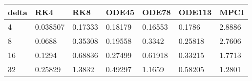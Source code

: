 \begin{tabular}{lllllll}
delta & RK4 & RK8 & ODE45 & ODE78 & ODE113 & MPCI \\ 
\hline 
4 & 0.038507 & 0.17333 & 0.18179 & 0.16553 & 0.1786 & 2.8886 \\ 
8 & 0.0688 & 0.35308 & 0.19558 & 0.3342 & 0.25818 & 2.7606 \\ 
16 & 0.1294 & 0.68836 & 0.27499 & 0.61918 & 0.33215 & 1.7713 \\ 
32 & 0.25829 & 1.3832 & 0.49297 & 1.1659 & 0.58205 & 1.2801 \\ 
\hline 
\end{tabular}